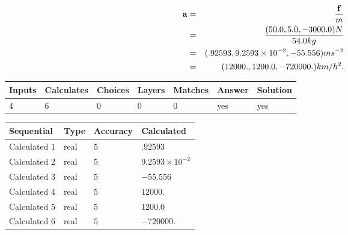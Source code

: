 \documentclass[12pt]{article}
\begin{document}
\begin{eqnarray*}
\mathbf{a}&=&\frac{\mathbf{f}}m  \\
&=&\frac{(
50.0 ,
5.0 ,
-3000.0 )N
}{ %
54.0 kg}  \\
&=&(
.92593 ,
9.2593 \times 10^{-2},
-55.556
)ms^{-2} \\
&=&(
12000. ,
1200.0 ,
-720000.
)km/h^2.
\end{eqnarray*}
 
 
 
\noindent{}
 
 

 
\vspace{0.3in}
   
   
   
   
\noindent\begin{tabular}{|l|l|l|l|l|l|l|}
 \hline
Inputs & Calculates & Choices & Layers & Matches & Answer & Solution \\ \hline
           4 & 
           6 & 
           0
  & 
           0 & 
           0 & 
  yes & 
  yes 
  \\ \hline
 \end{tabular}
   
   
   
   
\noindent{}
   
   
  
  
\noindent\begin{tabular}{|l|l|l|l|}
\hline
 Sequential & Type & Accuracy & Calculated \\ 
\hline
 
 
  Calculated $           1$ & real & $           5 $ & 
 $ .92593 $ 
 \\  \hline  
 
 
  Calculated $           2$ & real & $           5 $ & 
 $ 9.2593 \times 10^{-2} $ 
 \\  \hline  
 
 
  Calculated $           3$ & real & $           5 $ & 
 $ -55.556 $ 
 \\  \hline  
 
 
  Calculated $           4$ & real & $           5 $ & 
 $ 12000. $ 
 \\  \hline  
 
 
  Calculated $           5$ & real & $           5 $ & 
 $ 1200.0 $ 
 \\  \hline  
 
 
  Calculated $           6$ & real & $           5 $ & 
 $ -720000. $ 
 \\  \hline  
 \end{tabular}
   
\end{document}
